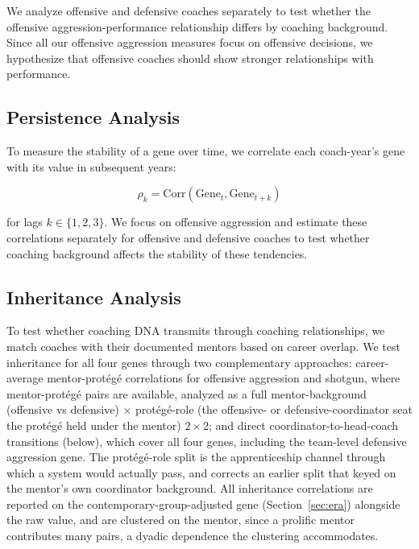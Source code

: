 \documentclass[USenglish]{article}
\theoremstyle{dgthm}
\theoremstyle{dgdef}
\begin{document}
We analyze offensive and defensive coaches separately to test whether the offensive aggression-performance relationship differs by coaching background. Since all our offensive aggression measures focus on offensive decisions, we hypothesize that offensive coaches should show stronger relationships with performance.

\subsection{Persistence Analysis}

To measure the stability of a gene over time, we correlate each coach-year's gene with its value in subsequent years:

\begin{equation}
\rho_k = \text{Corr}(\text{Gene}_{t}, \text{Gene}_{t+k})
\end{equation}

for lags $k \in \{1,2,3\}$. We focus on offensive aggression and estimate these correlations separately for offensive and defensive coaches to test whether coaching background affects the stability of these tendencies.

\subsection{Inheritance Analysis}

To test whether coaching DNA transmits through coaching relationships, we match coaches with their documented mentors based on career overlap. We test inheritance for all four genes through two complementary approaches: career-average mentor-prot\'{e}g\'{e} correlations for offensive aggression and shotgun, where mentor-prot\'{e}g\'{e} pairs are available, analyzed as a full mentor-background (offensive vs defensive) $\times$ prot\'{e}g\'{e}-role (the offensive- or defensive-coordinator seat the prot\'{e}g\'{e} held under the mentor) $2\times2$; and direct coordinator-to-head-coach transitions (below), which cover all four genes, including the team-level defensive aggression gene. The prot\'{e}g\'{e}-role split is the apprenticeship channel through which a system would actually pass, and corrects an earlier split that keyed on the mentor's own coordinator background. All inheritance correlations are reported on the contemporary-group-adjusted gene (Section~\ref{sec:era}) alongside the raw value, and are clustered on the mentor, since a prolific mentor contributes many pairs, a dyadic dependence the clustering accommodates.
\end{document}
